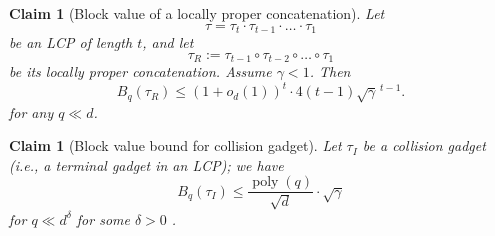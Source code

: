 \documentclass[12pt]{article}
\newtheorem{claim}[theorem]{Claim}
\newcommand{\poly}{\operatorname{poly}}
\begin{document}
\begin{claim}[Block value of a locally proper concatenation]
\label{clm:block-value-proper-prefix}
Let
\[
    \tau=\tau_t\cdot \tau_{t-1}\cdot \dots \cdot \tau_1
\]
be an LCP of length \(t\), and let
\[
    \tau_R
    :=
    \tau_{t-1}\circ \tau_{t-2}\circ \dots \circ \tau_1
\]
be its locally proper concatenation. Assume \(\gamma<1\). Then
\[
    B_q(\tau_R)
    \le
    (1+o_d(1))^t\cdot 4(t-1)\sqrt{\gamma}^{\,t-1}.
\]
for any $q\ll d$.
\end{claim}

\begin{claim}[Block value bound for collision gadget] \label{clm:collision-gadget-block-bound}
	Let $\tau_I$ be a collision gadget (i.e., a terminal gadget in an LCP); we have \[
	B_q(\tau_I) \leq  \frac{\poly(q)}{\sqrt{d}} \cdot \sqrt{\gamma}
	\]
	for   $q\ll d^{\delta}$ for some $\delta>0$
	.
\end{claim}
\end{document}
